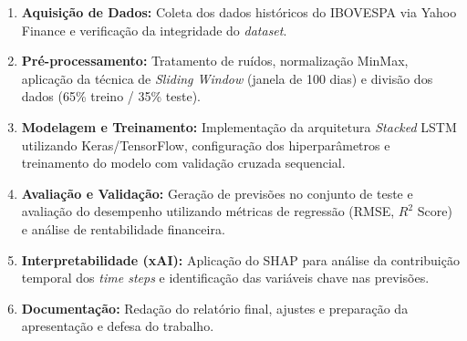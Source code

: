 \begin{enumerate}
    \item \textbf{Aquisição de Dados:} Coleta dos dados históricos do IBOVESPA via Yahoo Finance e verificação da integridade do \textit{dataset}.
    
    \item \textbf{Pré-processamento:} Tratamento de ruídos, normalização MinMax, aplicação da técnica de \textit{Sliding Window} (janela de 100 dias) e divisão dos dados (65\% treino / 35\% teste).
    
    \item \textbf{Modelagem e Treinamento:} Implementação da arquitetura \textit{Stacked} LSTM utilizando Keras/TensorFlow, configuração dos hiperparâmetros e treinamento do modelo com validação cruzada sequencial.
    
    \item \textbf{Avaliação e Validação:} Geração de previsões no conjunto de teste e avaliação do desempenho utilizando métricas de regressão (RMSE, $R^2$ Score) e análise de rentabilidade financeira.
    
    \item \textbf{Interpretabilidade (xAI):} Aplicação do SHAP para análise da contribuição temporal dos \textit{time steps} e identificação das variáveis chave nas previsões.
    
    \item \textbf{Documentação:} Redação do relatório final, ajustes e preparação da apresentação e defesa do trabalho.
\end{enumerate}






